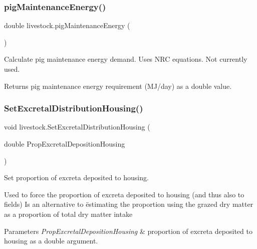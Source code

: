 \subsubsection{\texorpdfstring{pigMaintenanceEnergy()}{pigMaintenanceEnergy()}}
{\footnotesize\ttfamily double livestock.\+pig\+Maintenance\+Energy (\begin{DoxyParamCaption}{ }\end{DoxyParamCaption})\hspace{0.3cm}{\ttfamily [inline]}}



Calculate pig maintenance energy demand. Uses N\+RC equations. Not currently used. 

\begin{DoxyReturn}{Returns}
pig maintenance energy requirement (M\+J/day) as a double value. 
\end{DoxyReturn}
\mbox{\label{classlivestock_aae778774f618bd97cf190c55e8ad179f}} 
\subsubsection{\texorpdfstring{SetExcretalDistributionHousing()}{SetExcretalDistributionHousing()}}
{\footnotesize\ttfamily void livestock.\+Set\+Excretal\+Distribution\+Housing (\begin{DoxyParamCaption}\item[{double}]{Prop\+Excretal\+Deposition\+Housing }\end{DoxyParamCaption})\hspace{0.3cm}{\ttfamily [inline]}}



Set proportion of excreta deposited to housing. 

Used to force the proportion of excreta deposited to housing (and thus also to fields) Is an alternative to ëstimating the proportion using the grazed dry matter as a proportion of total dry matter intake 
\begin{DoxyParams}{Parameters}
{\em Prop\+Excretal\+Deposition\+Housing} & proportion of excreta deposited to housing as a double argument. \\
\hline
\end{DoxyParams}
\mbox{\label{classlivestock_a23c5edb2e2568bbcbe7357d56b6a5fb9}} 
